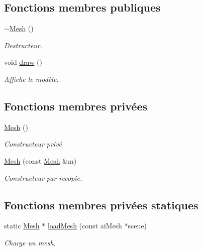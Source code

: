 \subsection*{Fonctions membres publiques}
\begin{DoxyCompactItemize}
\item 
\hyperlink{class_mesh_a5efe4da1a4c0971cfb037bd70304c303}{$\sim$\+Mesh} ()
\begin{DoxyCompactList}\small\item\em Destructeur. \end{DoxyCompactList}\item 
void \hyperlink{class_mesh_a996a8668fa2ca7d95d6d10744c833bc8}{draw} ()
\begin{DoxyCompactList}\small\item\em Affiche le modèle. \end{DoxyCompactList}\end{DoxyCompactItemize}
\subsection*{Fonctions membres privées}
\begin{DoxyCompactItemize}
\item 
\hyperlink{class_mesh_a2af137f1571af89172b9c102302c416b}{Mesh} ()
\begin{DoxyCompactList}\small\item\em Constructeur privé \end{DoxyCompactList}\item 
\hyperlink{class_mesh_a713cb62e7078cfd627108a0b14f72c6f}{Mesh} (const \hyperlink{class_mesh}{Mesh} \&m)
\begin{DoxyCompactList}\small\item\em Constructeur par recopie. \end{DoxyCompactList}\end{DoxyCompactItemize}
\subsection*{Fonctions membres privées statiques}
\begin{DoxyCompactItemize}
\item 
static \hyperlink{class_mesh}{Mesh} $\ast$ \hyperlink{class_mesh_a7b405216bda9e94d64aa8a308d718cb4}{load\+Mesh} (const ai\+Mesh $\ast$scene)
\begin{DoxyCompactList}\small\item\em Charge un mesh. \end{DoxyCompactList}\end{DoxyCompactItemize}
